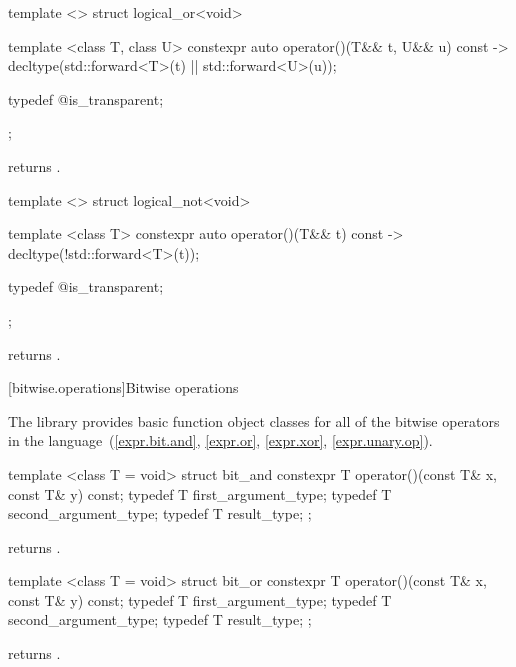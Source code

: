 %
\begin{itemdecl}
template <> struct logical_or<void> {
  template <class T, class U> constexpr auto operator()(T&& t, U&& u) const
    -> decltype(std::forward<T>(t) || std::forward<U>(u));

  typedef @\unspec@ is_transparent;
};
\end{itemdecl}

\begin{itemdescr}
\pnum
{} returns .
\end{itemdescr}

%
\begin{itemdecl}
template <> struct logical_not<void> {
  template <class T> constexpr auto operator()(T&& t) const
    -> decltype(!std::forward<T>(t));

  typedef @\unspec@ is_transparent;
};
\end{itemdecl}

\begin{itemdescr}
\pnum
{} returns .
\end{itemdescr}


[bitwise.operations]{Bitwise operations}

\pnum
The library provides basic function object classes for all of the bitwise
operators in the language~(\ref{expr.bit.and}, \ref{expr.or},
\ref{expr.xor}, \ref{expr.unary.op}).

%
\begin{itemdecl}
template <class T = void> struct bit_and {
  constexpr T operator()(const T& x, const T& y) const;
  typedef T first_argument_type;
  typedef T second_argument_type;
  typedef T result_type;
};
\end{itemdecl}

\begin{itemdescr}
\pnum
{} returns .
\end{itemdescr}

%
\begin{itemdecl}
template <class T = void> struct bit_or {
  constexpr T operator()(const T& x, const T& y) const;
  typedef T first_argument_type;
  typedef T second_argument_type;
  typedef T result_type;
};
\end{itemdecl}

\begin{itemdescr}
\pnum
{} returns .
\end{itemdescr}

